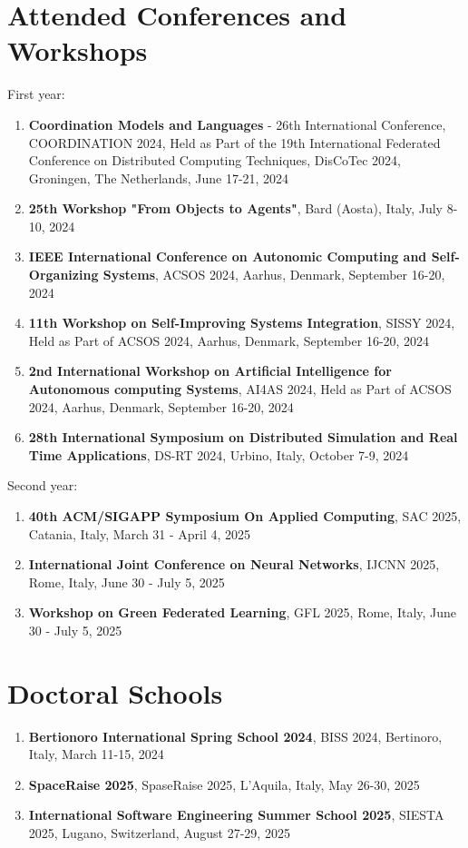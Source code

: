 \documentclass[runningheads]{llncs}
\begin{document}
\section{Attended Conferences and Workshops}
First year:
\begin{enumerate}
    \item \textbf{Coordination Models and Languages} - 26th International Conference, COORDINATION 2024, Held as Part of the 19th International Federated Conference on Distributed Computing Techniques, DisCoTec 2024, Groningen, The Netherlands, June 17-21, 2024
    \item \textbf{25th Workshop "From Objects to Agents"}, Bard (Aosta), Italy, July 8-10, 2024
    \item \textbf{IEEE International Conference on Autonomic Computing and Self-Organizing Systems}, ACSOS 2024, Aarhus, Denmark, September 16-20, 2024
    \item \textbf{11th Workshop on Self-Improving Systems Integration}, SISSY 2024, Held as Part of ACSOS 2024, Aarhus, Denmark, September 16-20, 2024
    \item \textbf{2nd International Workshop on Artificial Intelligence for Autonomous computing Systems}, AI4AS 2024, Held as Part of ACSOS 2024, Aarhus, Denmark, September 16-20, 2024
    \item \textbf{28th International Symposium on Distributed Simulation and Real Time Applications}, DS-RT 2024, Urbino, Italy, October 7-9, 2024
\end{enumerate}
Second year:
\begin{enumerate}
    \item \textbf{40th ACM/SIGAPP Symposium On Applied Computing}, SAC 2025, Catania, Italy, March 31 - April 4, 2025
    \item \textbf{International Joint Conference on Neural Networks}, IJCNN 2025, Rome, Italy,  June 30 - July 5, 2025
    \item \textbf{Workshop on Green Federated Learning}, GFL 2025, Rome, Italy,  June 30 - July 5, 2025
\end{enumerate}

\section{Doctoral Schools}
\begin{enumerate}
    \item \textbf{Bertionoro International Spring School 2024}, BISS 2024, Bertinoro, Italy, March 11-15, 2024
    \item \textbf{SpaceRaise 2025}, SpaseRaise 2025, L'Aquila, Italy, May 26-30, 2025
    \item \textbf{International Software Engineering Summer School 2025}, SIESTA 2025, Lugano, Switzerland, August 27-29, 2025
\end{enumerate}
\end{document}

